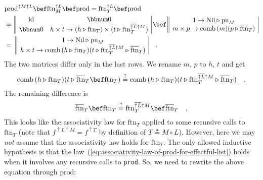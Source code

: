 \begin{align*}
 & \text{prod}^{\uparrow M\uparrow L}\bef\text{ftn}_{M}^{\uparrow L}\bef\text{prod}=\text{ftn}_{T}^{\uparrow L}\bef\text{prod}\\
 & =\,\begin{array}{||cc|}
\text{id} & \bbnum 0\\
\bbnum 0 & h\times t\rightarrow(h\triangleright\text{ftn}_{T})\times(t\triangleright\text{ftn}_{T}^{\overline{\uparrow L}\uparrow M})
\end{array}\,\bef\,\begin{array}{||c|}
1\rightarrow\text{Nil}\triangleright\text{pu}_{M}\\
m\times p\rightarrow\text{comb}\,(m)(p\triangleright\overline{\text{ftn}}_{T})
\end{array}\\
 & =\,\,\begin{array}{||c|}
1\rightarrow\text{Nil}\triangleright\text{pu}_{M}\\
h\times t\rightarrow\text{comb}\,(h\triangleright\text{ftn}_{T})(t\triangleright\text{ftn}_{T}^{\overline{\uparrow L}\uparrow M}\triangleright\overline{\text{ftn}}_{T})
\end{array}\quad.
\end{align*}
The two matrices differ only in the last rows. We rename $m$, $p$
to $h$, $t$ and get 
\[
\text{comb}\,(h\triangleright\text{ftn}_{T})(t\triangleright\overline{\text{ftn}}_{T}\bef\text{ftn}_{T})\overset{?}{=}\text{comb}\,(h\triangleright\text{ftn}_{T})(t\triangleright\text{ftn}_{T}^{\overline{\uparrow L}\uparrow M}\triangleright\overline{\text{ftn}}_{T})\quad.
\]
The remaining difference is
\[
\overline{\text{ftn}}_{T}\bef\text{ftn}_{T}\overset{?}{=}\text{ftn}_{T}^{\overline{\uparrow L}\uparrow M}\bef\overline{\text{ftn}}_{T}\quad.
\]
This looks like the associativity law for $\text{ftn}_{T}$ applied
to some recursive calls to $\text{ftn}_{T}$ (note that $f^{\uparrow L\uparrow M}=f^{\uparrow T}$
by definition of $T\triangleq M\circ L$). However, here we may \emph{not}
assume that the associativity law holds for $\text{ftn}_{T}$. The
only allowed inductive hypothesis is that the law~(\ref{eq:associativity-law-of-prod-for-effectful-list})
holds when it involves any recursive calls to \lstinline!prod!. So,
we need to rewrite the above equation through $\overline{\text{prod}}$:
